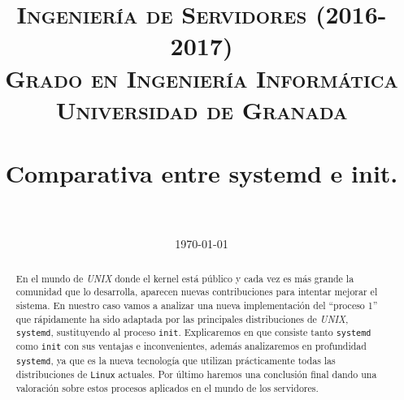 


\title{	
\normalfont \normalsize 
\textsc{\textbf{Ingeniería de Servidores (2016-2017)} \\ Grado en Ingeniería Informática \\ Universidad de Granada} \\ [25pt] %
\horrule{0.5pt} \\[0.4cm] %
\huge Comparativa entre systemd e init. \\ %
\horrule{2pt} \\[0.5cm] %
}

\date{\normalsize\today} %




\maketitle %

\newpage

\begin{abstract}

En el mundo de \textit{UNIX} donde el kernel está público y cada vez es más grande la comunidad que lo desarrolla, aparecen nuevas contribuciones para intentar mejorar el sistema. En nuestro caso vamos a analizar una nueva implementación del ``proceso 1'' que rápidamente ha sido adaptada por las principales distribuciones de \textit{UNIX}, \texttt{systemd}, sustituyendo al proceso \texttt{init}. Explicaremos en que consiste tanto \texttt{systemd} como \texttt{init} con sus ventajas e inconvenientes, además analizaremos en profundidad \texttt{systemd}, ya que es la nueva tecnología que utilizan prácticamente todas las distribuciones de \texttt{Linux} actuales. Por último haremos una conclusión final dando una valoración sobre estos procesos aplicados en el mundo de los servidores.



\end{abstract}

